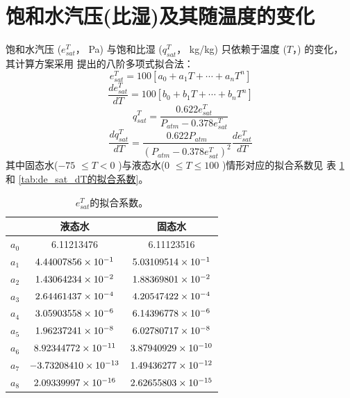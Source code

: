 \section{饱和水汽压(比湿)及其随温度的变化}\label{饱和水汽压(比湿)及其随温度的变化}
饱和水汽压 ($e_{sat}^T$， Pa) 与饱和比湿 ($q_{sat}^T$， kg/kg) 只依赖于温度 ($T$，\textcelsius) 的变化，
其计算方案采用\citet{flatau1992polynomial} 提出的八阶多项式拟合法：
\begin{equation}
e_{s a t}^{T}=100\left[a_{0}+a_{1} T+\cdots+a_{n} T^{n}\right]
\end{equation}
\begin{equation}
\frac{d e_{s a t}^{T}}{d T}=100\left[b_{0}+b_{1} T+\cdots+b_{n} T^{n}\right]
\end{equation}
\begin{equation}
q_{s a t}^{T}=\frac{0.622 e_{s a t}^{T}}{P_{atm}-0.378 e_{s a t}^{T}}
\end{equation}
\begin{equation}
\frac{d q_{{sat }}^{T}}{d T}=\frac{0.622 P_{atm}}{\left(P_{atm}-0.378 e_{{sat }}^{T}\right)^{2}} \frac{d e_{{sat }}^{T}}{d T}
\end{equation}
其中固态水($-75$ \textcelsius $\le T < 0$ \textcelsius)与液态水($0$ \textcelsius $\le T\le100$ \textcelsius)情形对应的拟合系数见
表 \ref{tab:e_sat_T的拟合系数} 和 \ref{tab:de_sat_dT的拟合系数}。
\begin{table}[]
\centering
\caption{$e_{sat}^T$的拟合系数。}
\label{tab:e_sat_T的拟合系数}
\begin{tabular}{@{}lcc@{}}
\toprule
     &  液态水  & 固态水                         \\ \midrule
$a_0$ & 6.11213476        & 6.11123516       \\
$a_1$ & $\rm 4.44007856 \times 10^{-1}$   & $\rm 5.03109514 \times 10^{-1}$  \\
$a_2$ & $\rm 1.43064234 \times 10^{-2}$   & $\rm 1.88369801 \times 10^{-2}$  \\
$a_3$ & $\rm 2.64461437 \times 10^{-4}$   & $\rm 4.20547422 \times 10^{-4}$  \\
$a_4$ & $\rm 3.05903558 \times 10^{-6}$   & $\rm 6.14396778 \times 10^{-6}$  \\
$a_5$ & $\rm 1.96237241 \times 10^{-8}$   & $\rm 6.02780717 \times 10^{-8}$  \\
$a_6$ & $\rm 8.92344772 \times 10^{-11}$  & $\rm 3.87940929 \times 10^{-10}$ \\
$a_7$ & $\rm -3.73208410 \times 10^{-13}$ & $\rm 1.49436277 \times 10^{-12}$ \\
$a_8$ & $\rm 2.09339997 \times 10^{-16}$  & $\rm 2.62655803 \times 10^{-15}$ \\ \bottomrule
\end{tabular}
\end{table}

